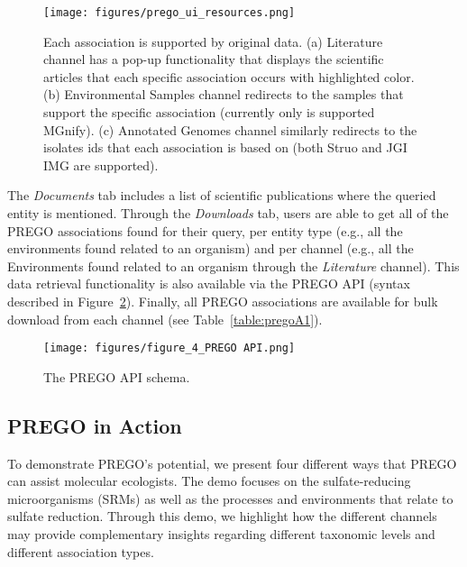    \begin{figure}[h]
      \centering
      \texttt{[image: figures/prego\_ui\_resources.png]}
      \caption[PREGO in action - examples]{ 
         Each association is supported by original data. 
         (a) Literature channel has a pop-up functionality that displays the scientific articles that each specific association occurs with highlighted color. 
         (b) Environmental Samples channel redirects to the samples that support the specific association (currently only is supported MGnify). 
         (c) Annotated Genomes channel similarly redirects to the isolates ids that each association is based on (both Struo and JGI IMG are supported).
      }
      \label{fig:prego_ui_resources}
   \end{figure}


   The \textit{Documents} tab includes a list of scientific publications where the queried entity is mentioned. 
   Through the \textit{Downloads} tab, users are able to get all of the PREGO associations found for their query, per entity type (e.g., all the environments found related to an organism) and per channel (e.g., all the Environments found related to an organism through the \textit{Literature} channel). 
   This data retrieval functionality is also available via the PREGO API (syntax described in Figure~\ref{fig:prego_api_schema}). 
   Finally, all PREGO associations are available for bulk download from each channel (see Table~\ref{table:pregoA1}).



   \begin{figure}[h]
      \centering
      \texttt{[image: figures/figure\_4\_PREGO API.png]}
      \caption[The PREGO API schema]{The PREGO API schema.}
      \label{fig:prego_api_schema}
   \end{figure}


   \subsection{PREGO in Action}
   \label{subsec:prego-action}

   To demonstrate PREGO's potential, we present four different ways that PREGO can assist molecular ecologists. 
   The demo focuses on the sulfate-reducing microorganisms (SRMs) as well as the processes and environments that relate to sulfate reduction. 
   Through this demo, we highlight how the different channels may provide complementary insights regarding different taxonomic levels and different association types.

